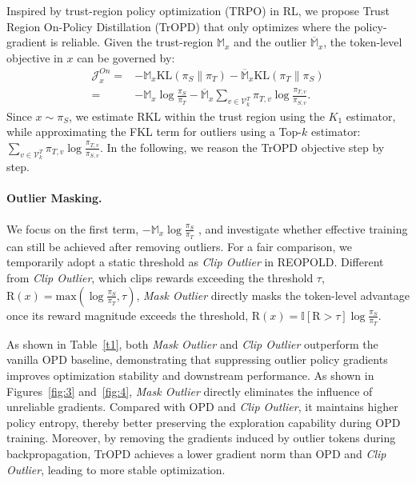 \documentclass{llmxive}
\begin{document}
Inspired by trust-region policy optimization (TRPO) in RL, we propose Trust Region On-Policy Distillation (TrOPD) that only optimizes where the policy-gradient is reliable. 
Given the trust-region $\mathbb{M}_{x}$ and the outlier $\overline{\mathbb{M}}_{x}$, the token-level objective in $x$ can be governed by:
\begin{equation}
\begin{aligned}
\mathcal{J}_{x}^{On}
={}&
-{\mathbb{M}_{x}}
    \mathrm{KL}(\pi_S \parallel \pi_T)
-{\overline{\mathbb{M}}_{x}}
    {
    \mathrm{KL}(\pi_T \parallel \pi_S)}
\\
={}&
-{\mathbb{M}_{x}}
    \log \frac{\pi_S}{\pi_T}
-{\overline{\mathbb{M}}_{x}}
    {
    \sum_{v \in \mathcal{V}^{T}_{k}}
    \pi_{T,v}
    \log \frac{\pi_{T,v}}{\pi_{S,v}}
    } .
\end{aligned}
\end{equation}
Since $x \sim \pi_S$, we estimate RKL within the trust region using the $K_1$ estimator, while approximating the FKL term for outliers using a Top-$k$ estimator:
$
{
\sum_{v \in \mathcal{V}^{T}_{k}}
\pi_{T,v}
\log \frac{\pi_{T,v}}{\pi_{S,v}}
}$.
In the following, we reason the TrOPD objective step by step.












\paragraph{Outlier Masking.} 
We focus on the first term, 
$-{\mathbb{M}_{x}}\log \frac{\pi_S}{\pi_T}$
, and investigate whether effective training can still be achieved after removing outliers. For a fair comparison, we temporarily adopt a static threshold as \textit{Clip Outlier} in REOPOLD. Different from \textit{Clip Outlier}, which clips rewards exceeding the threshold $\tau$, $\mathrm{R}(x)=\mathrm{max}(\log \frac{\pi_S}{\pi_T},\tau)$, \textit{Mask Outlier} directly masks the token-level advantage once its reward magnitude exceeds the threshold, $\mathrm{R}(x)=\mathbb{I}[\mathrm{R}>\tau]\log \frac{\pi_S}{\pi_T}$.

As shown in Table~\ref{t1}, both \textit{Mask Outlier} and \textit{Clip Outlier} outperform the vanilla OPD baseline, demonstrating that suppressing outlier policy gradients improves optimization stability and downstream performance. 
As shown in Figures~\ref{fig:3} and~\ref{fig:4}, \textit{Mask Outlier} directly eliminates the influence of unreliable gradients. Compared with OPD and \textit{Clip Outlier}, it maintains higher policy entropy, thereby better preserving the exploration capability during OPD training. Moreover, by removing the gradients induced by outlier tokens during backpropagation, TrOPD achieves a lower gradient norm than OPD and \textit{Clip Outlier}, leading to more stable optimization.
\end{document}

